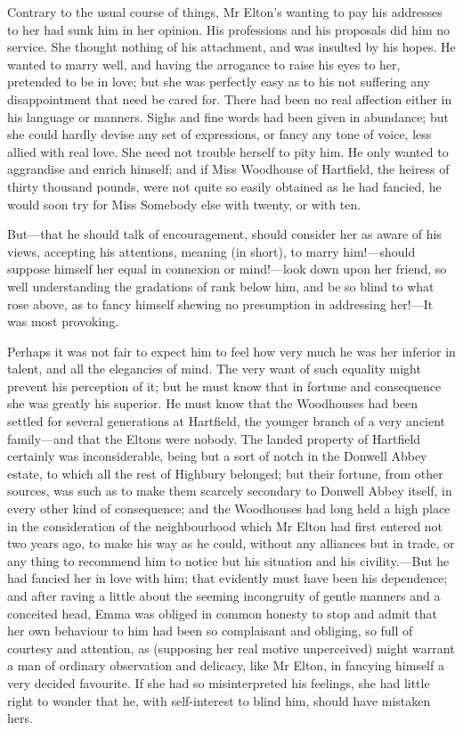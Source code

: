 Contrary to the usual course of things, Mr Elton's wanting to pay his addresses to her had sunk him in her opinion. His professions and his proposals did him no service. She thought nothing of his attachment, and was insulted by his hopes. He wanted to marry well, and having the arrogance to raise his eyes to her, pretended to be in love; but she was perfectly easy as to his not suffering any disappointment that need be cared for. There had been no real affection either in his language or manners. Sighs and fine words had been given in abundance; but she could hardly devise any set of expressions, or fancy any tone of voice, less allied with real love. She need not trouble herself to pity him. He only wanted to aggrandise and enrich himself; and if Miss Woodhouse of Hartfield, the heiress of thirty thousand pounds, were not quite so easily obtained as he had fancied, he would soon try for Miss Somebody else with twenty, or with ten.

But—that he should talk of encouragement, should consider her as aware of his views, accepting his attentions, meaning (in short), to marry him!—should suppose himself her equal in connexion or mind!—look down upon her friend, so well understanding the gradations of rank below him, and be so blind to what rose above, as to fancy himself shewing no presumption in addressing her!—It was most provoking.

Perhaps it was not fair to expect him to feel how very much he was her inferior in talent, and all the elegancies of mind. The very want of such equality might prevent his perception of it; but he must know that in fortune and consequence she was greatly his superior. He must know that the Woodhouses had been settled for several generations at Hartfield, the younger branch of a very ancient family—and that the Eltons were nobody. The landed property of Hartfield certainly was inconsiderable, being but a sort of notch in the Donwell Abbey estate, to which all the rest of Highbury belonged; but their fortune, from other sources, was such as to make them scarcely secondary to Donwell Abbey itself, in every other kind of consequence; and the Woodhouses had long held a high place in the consideration of the neighbourhood which Mr Elton had first entered not two years ago, to make his way as he could, without any alliances but in trade, or any thing to recommend him to notice but his situation and his civility.—But he had fancied her in love with him; that evidently must have been his dependence; and after raving a little about the seeming incongruity of gentle manners and a conceited head, Emma was obliged in common honesty to stop and admit that her own behaviour to him had been so complaisant and obliging, so full of courtesy and attention, as (supposing her real motive unperceived) might warrant a man of ordinary observation and delicacy, like Mr Elton, in fancying himself a very decided favourite. If she had so misinterpreted his feelings, she had little right to wonder that he, with self-interest to blind him, should have mistaken hers.

